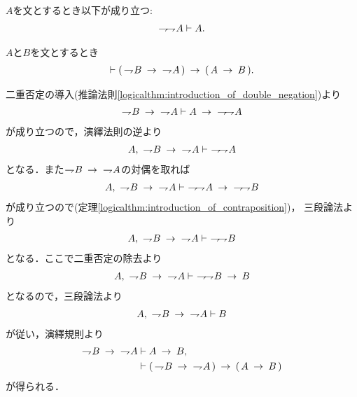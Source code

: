 	\begin{screen}
		\begin{logicalaxm}[二重否定の除去]
		\label{logicalaxm:elimination_of_double_negation}
			$A$を文とするとき以下が成り立つ:
			\begin{align}
				\negation \negation A \vdash A.
			\end{align}
		\end{logicalaxm}
	\end{screen}
	
	\begin{screen}
		\begin{logicalthm}[対偶論法の原理]
		\label{logicalthm:proof_by_contraposition}
			$A$と$B$を文とするとき
			\begin{align}
				\vdash (\, \negation B \rarrow\ \negation A\, )
				\rarrow (\, A \rarrow B\, ).
			\end{align}
		\end{logicalthm}
	\end{screen}
	
	\begin{prf}
		二重否定の導入(推論法則\ref{logicalthm:introduction_of_double_negation})より
		\begin{align}
			\negation B \rarrow\ \negation A \vdash 
			A \rarrow\ \negation \negation A
		\end{align}
		が成り立つので，演繹法則の逆より
		\begin{align}
			A,\ \negation B \rarrow\ \negation A \vdash\ \negation \negation A
		\end{align}
		となる．また$\negation B \rarrow\ \negation A$の対偶を取れば
		\begin{align}
			A,\ \negation B \rarrow\ \negation A \vdash\ 
			\negation \negation A \rarrow\ \negation \negation B
		\end{align}
		が成り立つので(定理\ref{logicalthm:introduction_of_contraposition})，
		三段論法より
		\begin{align}
			A,\ \negation B \rarrow\ \negation A \vdash\ \negation \negation B
		\end{align}
		となる．ここで二重否定の除去より
		\begin{align}
			A,\ \negation B \rarrow\ \negation A \vdash\ 
			\negation \negation B \rarrow B
		\end{align}
		となるので，三段論法より
		\begin{align}
			A,\ \negation B \rarrow\ \negation A \vdash B
		\end{align}
		が従い，演繹規則より
		\begin{align}
			\negation B \rarrow\ \negation A &\vdash A \rarrow B, \\
			&\vdash (\, \negation B \rarrow\ \negation A\, ) 
			\rarrow (\, A \rarrow B\, )
		\end{align}
		が得られる．
		\QED
	\end{prf}
	
